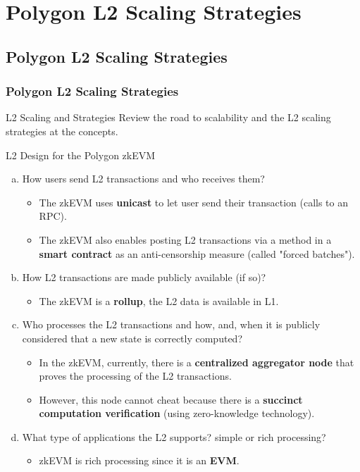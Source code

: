 

\renewcommand{\mytitle}{Polygon L2 Scaling Strategies}
\ifZEROSEC \fi
\ifSEC \section{\mytitle{}}\fi
\ifSUBSEC \subsection{\mytitle{}}\fi
\ifSUBSUBSEC \subsubsection{\mytitle{}}\fi


\begin{frame}{L2 Scaling and Strategies}
Review the road to scalability and the
L2 scaling strategies at the concepts.
\end{frame}




\begin{frame}{L2 Design for the Polygon zkEVM}
\begin{enumerate}[a)]
\item How users send L2 transactions and who receives them?
  \begin{itemize}
  \item The zkEVM uses \textbf{unicast} to let user send their transaction (calls to an RPC).
  \item The zkEVM also enables posting L2 transactions via a method in a \textbf{smart contract}
  as an anti-censorship measure (called "forced batches").
  \end{itemize}
\item How L2 transactions are made publicly available (if so)?
  \begin{itemize}
  \item The zkEVM is a \textbf{rollup}, the L2 data is available in L1.
  \end{itemize}
\item Who processes the L2 transactions and how, and, when
it is publicly considered that a new state is correctly computed?
  \begin{itemize}
  \item In the zkEVM, currently, there is a \textbf{centralized aggregator node} that proves the
 processing of the L2 transactions.
  \item However, this node cannot cheat because there is a \textbf{succinct computation verification}
  (using zero-knowledge technology).
  \end{itemize}
\item What type of applications the L2 supports? simple or rich processing?
  \begin{itemize}
  \item zkEVM is rich processing since it is an \textbf{EVM}.
  \end{itemize}
\end{enumerate}
\end{frame}